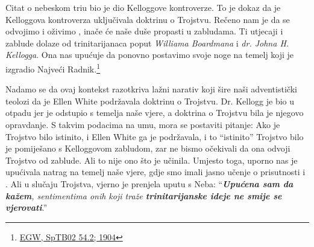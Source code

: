 Citat o nebeskom triu bio je dio Kelloggove kontroverze. To je dokaz da je Kelloggova kontroverza uključivala doktrinu o Trojstvu. Rečeno nam je da se odvojimo  i oživimo , inače će naše duše propasti u zabludama. Ti utjecaji i zablude dolaze od trinitarijanaca poput \textit{Williama Boardmana} i \textit{dr. Johna H. Kellogga}. Ona nas upućuje da ponovno postavimo svoje noge na temelj koji je izgradio Najveći Radnik.\footnote{\href{https://egwwritings.org/?ref=en_SpTB02.54.2&para=417.276}{EGW, SpTB02 54.2; 1904}}

Nadamo se da ovaj kontekst razotkriva lažni narativ koji šire naši adventistički teolozi da je Ellen White podržavala doktrinu o Trojstvu. Dr. Kellogg je bio u otpadu jer je odstupio s temelja naše vjere, a doktrina o Trojstvu bila je njegovo opravdanje. S takvim podacima na umu, mora se postaviti pitanje: Ako je Trojstvo bilo istinito, i Ellen White ga je podržavala, i to “istinito” Trojstvo bilo je pomiješano s Kelloggovom zabludom, zar ne bismo očekivali da ona odvoji Trojstvo od zablude. Ali to nije ono što je učinila. Umjesto toga, uporno nas je upućivala natrag na temelj naše vjere, gdje smo imali jasno učenje o prisutnosti i . Ali u slučaju Trojstva, vjerno je prenjela uputu s Neba: “\textit{\textbf{Upućena sam da kažem}, sentimentima onih koji traže \textbf{trinitarijanske ideje ne smije se vjerovati}}.”

